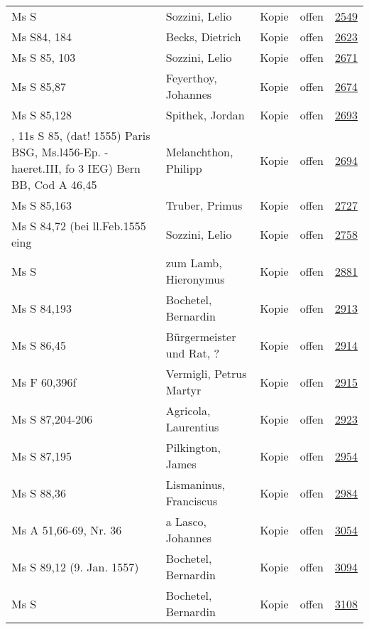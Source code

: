 \documentclass[10pt,a4paper,landscape]{report}
\begin{document}
\begin{longtable}{p{16cm}p{4cm}llr}
Ms S	&	Sozzini, Lelio	&	Kopie	&	offen	&	\href{http://130.60.24.72/assignment/2549}{2549}\\
Ms S84, 184	&	Becks, Dietrich	&	Kopie	&	offen	&	\href{http://130.60.24.72/assignment/2623}{2623}\\
Ms S 85, 103	&	Sozzini, Lelio	&	Kopie	&	offen	&	\href{http://130.60.24.72/assignment/2671}{2671}\\
Ms S 85,87	&	Feyerthoy, Johannes	&	Kopie	&	offen	&	\href{http://130.60.24.72/assignment/2674}{2674}\\
Ms S 85,128	&	Spithek, Jordan	&	Kopie	&	offen	&	\href{http://130.60.24.72/assignment/2693}{2693}\\
, 11s S 85, (dat! 1555) Paris BSG, Ms.l456-Ep. - haeret.III, fo 3 IEG) Bern BB, Cod A 46,45	&	Melanchthon, Philipp	&	Kopie	&	offen	&	\href{http://130.60.24.72/assignment/2694}{2694}\\
Ms S 85,163	&	Truber, Primus	&	Kopie	&	offen	&	\href{http://130.60.24.72/assignment/2727}{2727}\\
Ms S 84,72 (bei ll.Feb.1555 eing	&	Sozzini, Lelio	&	Kopie	&	offen	&	\href{http://130.60.24.72/assignment/2758}{2758}\\
Ms S	&	zum Lamb, Hieronymus	&	Kopie	&	offen	&	\href{http://130.60.24.72/assignment/2881}{2881}\\
Ms S 84,193	&	Bochetel, Bernardin	&	Kopie	&	offen	&	\href{http://130.60.24.72/assignment/2913}{2913}\\
Ms S 86,45	&	Bürgermeister und Rat, ?	&	Kopie	&	offen	&	\href{http://130.60.24.72/assignment/2914}{2914}\\
Ms F 60,396f	&	Vermigli, Petrus Martyr	&	Kopie	&	offen	&	\href{http://130.60.24.72/assignment/2915}{2915}\\
Ms S 87,204-206	&	Agricola, Laurentius	&	Kopie	&	offen	&	\href{http://130.60.24.72/assignment/2923}{2923}\\
Ms S 87,195	&	Pilkington, James	&	Kopie	&	offen	&	\href{http://130.60.24.72/assignment/2954}{2954}\\
Ms S 88,36	&	Lismaninus, Franciscus	&	Kopie	&	offen	&	\href{http://130.60.24.72/assignment/2984}{2984}\\
Ms A 51,66-69, Nr. 36	&	a Lasco, Johannes	&	Kopie	&	offen	&	\href{http://130.60.24.72/assignment/3054}{3054}\\
Ms S 89,12 (9. Jan. 1557)	&	Bochetel, Bernardin	&	Kopie	&	offen	&	\href{http://130.60.24.72/assignment/3094}{3094}\\
Ms S	&	Bochetel, Bernardin	&	Kopie	&	offen	&	\href{http://130.60.24.72/assignment/3108}{3108}\\

\end{longtable}
\end{document}
